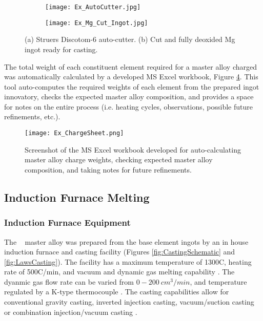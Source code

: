 \documentclass[a4paper,12pt,oneside]{report}%
\begin{document}
\begin{figure}[htbp]
	\centering
	\begin{subfigure}[htbp]{0.49\textwidth}
		\texttt{[image: Ex\_AutoCutter.jpg]}
		\caption{}
		\label{fig:AutoCutter}
	\end{subfigure}
	\begin{subfigure}[htbp]{0.30\textwidth}
		\texttt{[image: Ex\_Mg\_Cut\_Ingot.jpg]}
		\caption{}
		\label{fig:MgIngot}
	\end{subfigure}
	\caption{(a) Struers Discotom-6 auto-cutter. (b) Cut and fully deoxided Mg ingot ready for casting.}%
	\label{fig:Cutter_MgIngot}
\end{figure}

The total weight of each constituent element required for a master alloy charged was automatically calculated by a developed MS Excel workbook, Figure \ref{fig:ChargeSheet}. This tool auto-computes the required weights of each element from the prepared ingot innovatory, checks the expected master alloy composition, and provides a space for notes on the entire process (i.e. heating cycles, observations, possible future refinements, etc.).

\begin{figure}[htbp]
	\centering
	\texttt{[image: Ex\_ChargeSheet.png]}
	\caption{Screenshot of the MS Excel workbook developed for auto-calculating master alloy charge weights, checking expected master alloy composition, and taking notes for future refinements.}
	\label{fig:ChargeSheet}
\end{figure}

\subsection{Induction Furnace Melting}
\subsubsection{Induction Furnace Equipment}
The \MgZnCa~ master alloy was prepared from the base element ingots by an in house induction furnace and casting facility (Figures \ref{fig:CastingSchematic} and \ref{fig:LawsCasting}). The facility has a maximum temperature of 1300\degree C, heating rate of 500\degree C/min, and vacuum and dynamic gas melting capability \cite{Laws2007}. The dyanmic gas flow rate can be varied from $0-200~ cm^{3}/min$, and temperature regulated by a K-type thermocouple \cite{Laws2007}. The casting capabilities allow for conventional gravity casting, inverted injection casting, vacuum/suction casting or combination injection/vacuum casting \cite{Laws2007}.
\end{document}
